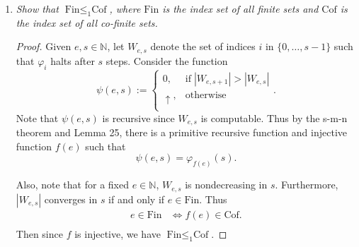\documentclass{article}
\begin{document}
\begin{enumerate}[label={\bf Q\arabic*:}]
  \item \it Show that $\text{Fin}\leq_1\text{Cof}$, where $\text{Fin}$ is
    the index set of all finite sets and $\text{Cof}$ is the index set of
    all co-finite sets.

    \begin{proof}
      Given $e,s\in\mathbb{N}$, let $W_{e,s}$ denote the set of indices $i$
      in $\{0,\ldots,s-1\}$ such that $\varphi_i$ halts after $s$ steps.
      Consider the function
      \begin{equation*}
        \psi(e,s) :=
        \begin{cases}
          0, &\text{if}\; |W_{e,s+1}|>|W_{e,s}|\\
          \uparrow, &\text{otherwise}\\
        \end{cases}.
      \end{equation*}
      Note that $\psi(e,s)$ is recursive since $W_{e,s}$ is computable.
      Thus by the s-m-n theorem and Lemma 25, there is a primitive
      recursive function and injective function $f(e)$ such that
      \[\psi(e,s)=\varphi_{f(e)}(s).\]

      Also, note that for a fixed $e\in\mathbb{N}$, $W_{e,s}$ is
      nondecreasing in $s$. Furthermore, $|W_{e,s}|$ converges in $s$ if
      and only if $e\in\text{Fin}$. Thus
      \begin{align*}
        e\in\text{Fin} &\Leftrightarrow f(e)\in\text{Cof}.\\
      \end{align*}
      Then since $f$ is injective, we have $\text{Fin}\leq_1\text{Cof}$.
    \end{proof}
\end{enumerate}
\end{document}
